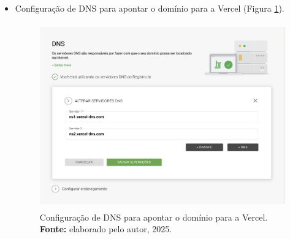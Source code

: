 \begin{itemize}
    \item Configuração de DNS para apontar o domínio para a Vercel (Figura \ref{fig:dns}).
\begin{figure}[H]
    \centering
    \includegraphics[height=8cm, keepaspectratio]{img/Deploy/configuração de dns registrobr.png}
    \caption{ Configuração de DNS para apontar o domínio para a Vercel. \\
        \textbf{Fonte:} elaborado pelo autor, 2025.}
    \label{fig:dns}
\end{figure}

\end{itemize}



